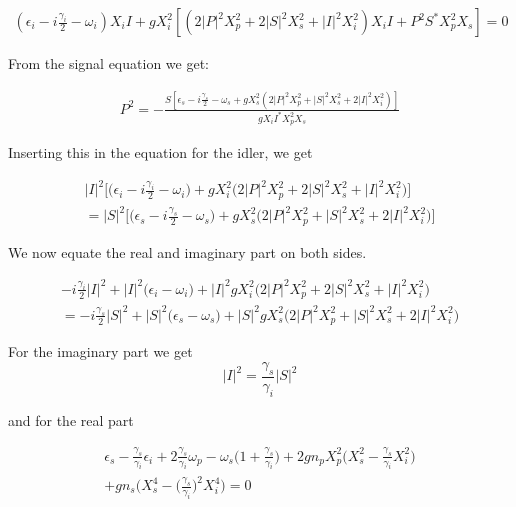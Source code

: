 \documentclass[a4paper,prb,10pt,aps,twocolumn]{revtex4-1}
\begin{document}
\begin{multline}
  \label{eq:22}
\left(\epsilon_{i}-i\frac{\gamma_{i}}{2}-\omega_{i}\right)X_{i}I+gX_{i}^{2}\left[\left(2|P|^{2}X_{p}^{2}+2|S|^{2}X_{s}^{2}+|I|^{2}X_{i}^{2}\right)X_{i}I+P^{2}S^{*}X_{p}^{2}X_{s}\right]=0  
\end{multline}

From the signal equation we get:

\begin{multline}
  \label{eq:23}
P^{2}=-\frac{S\left[\epsilon_{s}-i\frac{\gamma_{s}}{2}-\omega_{s}+gX_{s}^{2}\left(2|P|^{2}X_{p}^{2}+|S|^{2}X_{s}^{2}+2|I|^{2}X_{i}^{2}\right)\right]}{gX_{i}I^{*}X_{p}^{2}X_{s}}  
\end{multline}

Inserting this in the equation for the idler, we get

\begin{multline}
  \label{eq:24}
|I|^{2}\Bigg[\Bigg(\epsilon_{i}-i\frac{\gamma_{i}}{2}-\omega_{i}\Bigg)+gX_{i}^{2}\Bigg(2|P|^{2}X_{p}^{2}+2|S|^{2}X_{s}^{2}+|I|^{2}X_{i}^{2}\Bigg)\Bigg]\\
=|S|^{2}\Bigg[\Bigg(\epsilon_{s}-i\frac{\gamma_{s}}{2}-\omega_{s}\Bigg)+gX_{s}^{2}\Bigg(2|P|^{2}X_{p}^{2}+|S|^{2}X_{s}^{2}+2|I|^{2}X_{i}^{2}\Bigg)\Bigg]
\end{multline}

We now equate the real and imaginary part on both sides. 

\begin{multline}
  \label{eq:25}
-i\frac{\gamma_{i}}{2}|I|^{2}+|I|^{2}\Bigg(\epsilon_{i}-\omega_{i}\Bigg)+|I|^{2}gX_{i}^{2}\Bigg(2|P|^{2}X_{p}^{2}+2|S|^{2}X_{s}^{2}+|I|^{2}X_{i}^{2}\Bigg)\\
=-i\frac{\gamma_{s}}{2}|S|^{2}+|S|^{2}\Bigg(\epsilon_{s}-\omega_{s}\Bigg)+|S|^{2}gX_{s}^{2}\Bigg(2|P|^{2}X_{p}^{2}+|S|^{2}X_{s}^{2}+2|I|^{2}X_{i}^{2}\Bigg)
\end{multline}


For the imaginary part we get
\begin{equation}
  \label{eq:26}
|I|^{2}=\frac{\gamma_{s}}{\gamma_{i}}|S|^{2}  
\end{equation}

and for the real part

\begin{multline}
  \label{eq:27}
\epsilon_{s}-\frac{\gamma_{s}}{\gamma_{i}}\epsilon_{i}+2\frac{\gamma_{s}}{\gamma_{i}}\omega_{p}-\omega_{s}\Bigg(1+\frac{\gamma_{s}}{\gamma_{i}}\Bigg)+2gn_{p}X_{p}^{2}\Bigg(X_{s}^{2}-\frac{\gamma_{s}}{\gamma_{i}}X_{i}^{2}\Bigg)\\
+gn_{s}\Bigg(X_{s}^{4}-\Bigg(\frac{\gamma_{s}}{\gamma_{i}}\Bigg)^{2}X_{i}^{4}\Bigg)=0  
\end{multline}
\end{document}
